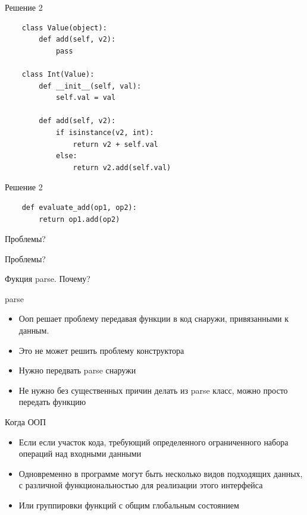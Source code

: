 \documentclass{article}
\begin{document}
\begin{center} Решение 2 \end{center}
\begin{lstlisting}
    class Value(object):
        def add(self, v2):
            pass

    class Int(Value):
        def __init__(self, val):
            self.val = val

        def add(self, v2):
            if isinstance(v2, int):
                return v2 + self.val
            else:
                return v2.add(self.val)
\end{lstlisting}
\newpage

\begin{center} Решение 2 \end{center}
\begin{lstlisting}
    def evaluate_add(op1, op2):
        return op1.add(op2)
\end{lstlisting}
\newpage

\begin{center} Проблемы? \end{center}
\newpage

\begin{center} Проблемы? \end{center}
Фукция parse. Почему?
\newpage

\begin{center} parse \end{center}
\begin{itemize}
    \item Ооп решает проблему передавая функции в код снаружи, привязанными к данным.
    \item Это не может решить проблему конструктора
    \item Нужно передвать parse снаружи
    \item Не нужно без существенных причин делать из parse класс, можно просто передать функцию
\end{itemize}
\newpage

\begin{center} Когда ООП \end{center}
\begin{itemize}
    \item Если если участок кода, требующий определенного ограниченного 
          набора операций над входными данными
    \item Одновременно в программе могут быть несколько видов подходящих данных, 
          с различной функциональностью для реализации этого интерфейса
    \item Или группировки функций с общим глобальным состоянием
\end{itemize}
\newpage
\end{document}
